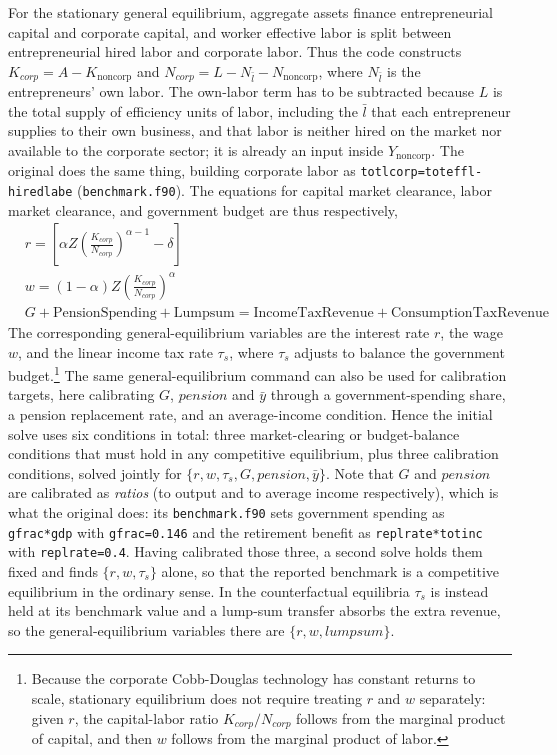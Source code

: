 \documentclass[11pt,fleqn]{article}
\begin{document}
For the stationary general equilibrium, aggregate assets finance entrepreneurial capital and corporate capital, and worker effective labor is split between entrepreneurial hired labor and corporate labor. Thus the code constructs $K_{corp}=A-K_{\text{noncorp}}$ and $N_{corp}=L-N_{\bar{l}}-N_{\text{noncorp}}$, where $N_{\bar{l}}$ is the entrepreneurs' own labor. The own-labor term has to be subtracted because $L$ is the total supply of efficiency units of labor, including the $\bar{l}$ that each entrepreneur supplies to their own business, and that labor is neither hired on the market nor available to the corporate sector; it is already an input inside $Y_{\text{noncorp}}$. The original does the same thing, building corporate labor as \texttt{totlcorp=toteffl-hiredlabe} (\texttt{benchmark.f90}). The equations for capital market clearance, labor market clearance, and government budget are thus respectively,
\begin{align*}
 & r = \left[\alpha Z\left(\frac{K_{corp}}{N_{corp}}\right)^{\alpha-1}-\delta\right] \\
 & w = (1-\alpha)Z\left(\frac{K_{corp}}{N_{corp}}\right)^{\alpha} \\
 & G+\text{PensionSpending}+\text{Lumpsum} = \text{IncomeTaxRevenue}+\text{ConsumptionTaxRevenue}
\end{align*}
The corresponding general-equilibrium variables are the interest rate $r$, the wage $w$, and the linear income tax rate $\tau_s$, where $\tau_s$ adjusts to balance the government budget.\footnote{Because the corporate Cobb-Douglas technology has constant returns to scale, stationary equilibrium does not require treating $r$ and $w$ separately: given $r$, the capital-labor ratio $K_{corp}/N_{corp}$ follows from the marginal product of capital, and then $w$ follows from the marginal product of labor.} The same general-equilibrium command can also be used for calibration targets, here calibrating $G$, $pension$ and $\bar{y}$ through a government-spending share, a pension replacement rate, and an average-income condition. Hence the initial solve uses six conditions in total: three market-clearing or budget-balance conditions that must hold in any competitive equilibrium, plus three calibration conditions, solved jointly for $\{r,w,\tau_s,G,pension,\bar{y}\}$. Note that $G$ and $pension$ are calibrated as \textit{ratios} (to output and to average income respectively), which is what the original does: its \texttt{benchmark.f90} sets government spending as \texttt{gfrac*gdp} with \texttt{gfrac=0.146} and the retirement benefit as \texttt{replrate*totinc} with \texttt{replrate=0.4}. Having calibrated those three, a second solve holds them fixed and finds $\{r,w,\tau_s\}$ alone, so that the reported benchmark is a competitive equilibrium in the ordinary sense. In the counterfactual equilibria $\tau_s$ is instead held at its benchmark value and a lump-sum transfer absorbs the extra revenue, so the general-equilibrium variables there are $\{r,w,lumpsum\}$.
\end{document}
